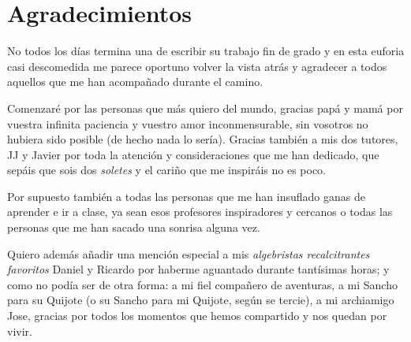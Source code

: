 

\chapter*{Agradecimientos}

No todos los días termina una de escribir su trabajo fin de grado y en esta euforia casi descomedida me parece oportuno volver la vista atrás y agradecer a todos aquellos que me han acompañado durante el camino. 

Comenzaré por 
las personas que más quiero del mundo, gracias papá y mamá por vuestra infinita paciencia y vuestro amor inconmensurable, sin vosotros no hubiera sido posible (de hecho nada lo sería). 
Gracias también a mis dos tutores, JJ y Javier por toda la atención y consideraciones que me han dedicado, que sepáis que sois dos \textit{soletes} y el cariño que me inspiráis no es poco.

Por supuesto también a todas las personas que me han insuflado ganas de aprender e ir a clase, ya sean esos profesores inspiradores y cercanos o 
todas las personas que me han sacado una sonrisa alguna vez. 

Quiero además añadir una mención especial a mis \textit{algebristas recalcitrantes favoritos} Daniel y Ricardo por haberme aguantado durante tantísimas horas; y como no podía ser de otra forma: a mi fiel compañero de aventuras, a mi Sancho para su Quijote (o su Sancho para mi Quijote, según se tercie), a mi archiamigo Jose, gracias por todos los momentos que hemos compartido y nos quedan por vivir. 


\endinput
